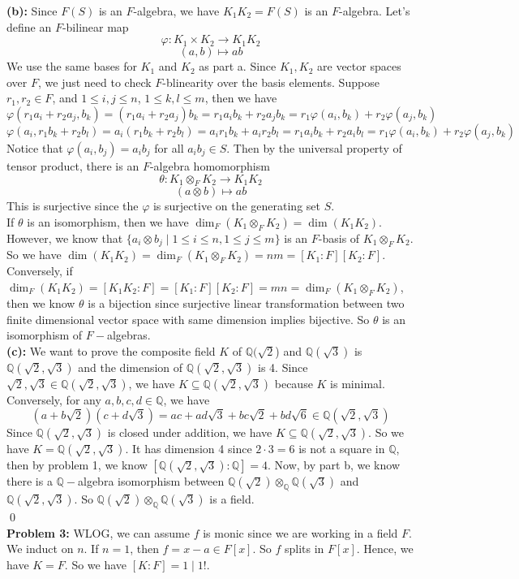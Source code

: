 \documentclass[12pt]{amsart}
\newcommand{\Q}{\mathbb{Q}}
\begin{document}
\textbf{(b):} Since $F(S)$ is an $F$-algebra, we have $K_1K_2=F(S)$ is an $F$-algebra. Let's define an $F$-bilinear map
\[\varphi: K_1\times K_2\to K_1K_2\]
\[(a,b)\mapsto ab\]
We use the same bases for $K_1$ and $K_2$ as part a. Since $K_1,K_2$ are vector spaces over $F$, we just need to check $F$-blinearity over the basis elements. Suppose $r_1,r_2\in F$, and $1\leq i,j\leq n$, $1\leq k,l\leq m$, then we have 
\[\varphi(r_1a_i+r_2a_j,b_k)=(r_1a_i+r_2a_j)b_k=r_1a_ib_k+r_2a_jb_k=r_1\varphi(a_i,b_k)+r_2\varphi(a_j,b_k)\]
\[\varphi(a_i,r_1b_k+r_2b_l)=a_i(r_1b_k+r_2b_l)=a_ir_1b_k+a_ir_2b_l=r_1a_ib_k+r_2a_ib_l=r_1\varphi(a_i,b_k)+r_2\varphi(a_j,b_k)\]
Notice that $\varphi(a_i,b_j)=a_ib_j$ for all $a_ib_j\in S$. 
Then by the universal property of tensor product, there is an $F$-algebra homomorphism 
\[\theta: K_1\otimes_F K_2\to K_1K_2\]
\[(a\otimes b)\mapsto ab\]
This is surjective since the $\varphi$ is surjective on the generating set $S$.\\
If $\theta$ is an isomorphism, then we have $\dim_F(K_1\otimes_F K_2)=\dim(K_1K_2)$. However, we know that $\{a_i\otimes b_j\mid 1\leq i\leq n,1\leq j\leq m\}$ is an $F$-basis of $K_1\otimes_F K_2$. So we have $\dim(K_1K_2)=\dim_F(K_1\otimes_F K_2)=nm=[K_1:F][K_2:F]$. Conversely, if $\dim_F(K_1K_2)=[K_1K_2:F]=[K_1:F][K_2:F]=mn=\dim_F(K_1\otimes_F K_2)$, then we know $\theta$ is a bijection since surjective linear transformation between two finite dimensional vector space with same dimension implies bijective. So $\theta$ is an isomorphism of $F-$algebras.\\
\textbf{(c):} We want to prove the composite field $K$ of $\Q(\sqrt{2}$) and $\Q(\sqrt{3})$ is $\Q(\sqrt{2},\sqrt{3})$ and the dimension of $\Q(\sqrt{2},\sqrt{3})$ is 4. Since $\sqrt{2},\sqrt{3}\in \Q(\sqrt{2},\sqrt{3})$, we have $K\subseteq \Q(\sqrt{2},\sqrt{3})$ because $K$ is minimal. Conversely, for any $a,b,c,d\in\Q$, we have 
\[(a+b\sqrt{2})(c+d\sqrt{3})=ac+ad\sqrt{3}+bc\sqrt{2}+bd\sqrt{6}\in\Q(\sqrt{2},\sqrt{3})\]
Since $\Q(\sqrt{2},\sqrt{3})$ is closed under addition, we have $K\subseteq \Q(\sqrt{2},\sqrt{3})$. So we have $K=\Q(\sqrt{2},\sqrt{3})$. It has dimension 4 since $2\cdot 3=6$ is not a square in $\Q$, then by problem 1, we know $[\Q(\sqrt{2},\sqrt{3}):\Q]=4$. Now, by part b, we know there is a $\Q-$algebra isomorphism between $\Q(\sqrt{2})\otimes_\Q\Q(\sqrt{3})$ and $\Q(\sqrt{2},\sqrt{3})$. So $\Q(\sqrt{2})\otimes_\Q\Q(\sqrt{3})$ is a field.
\\\qed\\
\textbf{Problem 3:} WLOG, we can assume $f$ is monic since we are working in a field $F$. We induct on $n$. If $n=1$, then $f=x-a\in F[x]$. So $f$ splits in $F[x]$. Hence, we have $K=F$. So we have $[K:F]=1\mid 1!$.\\
\end{document}

